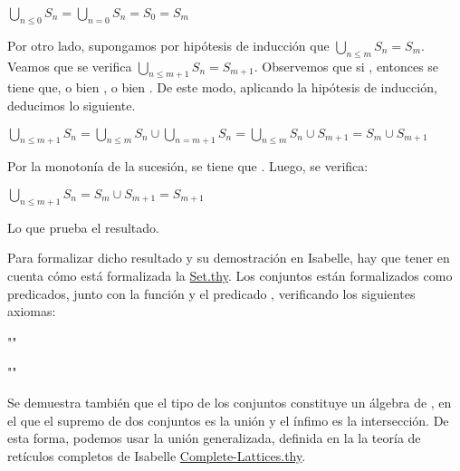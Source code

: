\begin{isabellebody}
\begin{isamarkuptext}
\begin{demostracion}
  $\bigcup_{n \leq 0} S_{n} = \bigcup_{n = 0} S_{n} = S_{0} = S_{m}$

  Por otro lado, supongamos por hipótesis de inducción que $\bigcup_{n \leq m} S_{n} = S_{m}$.
  Veamos que se verifica $\bigcup_{n \leq m + 1} S_{n} = S_{m + 1}$. Observemos que si ,
  entonces se tiene que, o bien , o bien . De este modo, aplicando la 
  hipótesis de inducción, deducimos lo siguiente.

  $\bigcup_{n \leq m + 1} S_{n} = \bigcup_{n \leq m} S_{n} \cup \bigcup_{n = m + 1} S_{n} = \bigcup_{n \leq m} S_{n} \cup S_{m + 1} = S_{m} \cup S_{m + 1}$

  Por la monotonía de la sucesión, se tiene que . Luego, se verifica:

  $\bigcup_{n \leq m + 1} S_{n} = S_{m} \cup S_{m + 1} = S_{m + 1}$

  Lo que prueba el resultado.
\end{demostracion}

  Para formalizar dicho resultado y su demostración en Isabelle, hay que tener en cuenta cómo está
  formalizada la  \href{https://bit.ly/3ibCuje}{Set.thy}. Los conjuntos están 
  formalizados como predicados, junto con la función  y el predicado , verificando 
  los siguientes axiomas:

    ""

   ""

  Se demuestra también que el tipo de los conjuntos constituye un álgebra de , en el que el 
  supremo de dos conjuntos es la unión y el ínfimo es la intersección. De esta forma, podemos usar 
  la unión generalizada, definida en la la teoría de retículos completos de Isabelle 
  \href{https://n9.cl/gtf5x}{Complete-Lattices.thy}.


\end{isamarkuptext}
\end{isabellebody}

